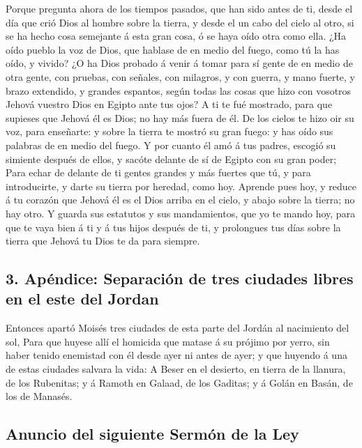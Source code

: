  Porque pregunta ahora de los tiempos pasados, que han sido
antes de ti, desde el día que crió Dios al hombre sobre la tierra, y
desde el un cabo del cielo al otro, si se ha hecho cosa semejante á esta
gran cosa, ó se haya oído otra como ella.  ¿Ha oído pueblo
la voz de Dios, que hablase de en medio del fuego, como tú la has oído,
y vivido?  ¿O ha Dios probado á venir á tomar para sí gente
de en medio de otra gente, con pruebas, con señales, con milagros, y con
guerra, y mano fuerte, y brazo extendido, y grandes espantos, según
todas las cosas que hizo con vosotros Jehová vuestro Dios en Egipto ante
tus ojos?  A ti te fué mostrado, para que supieses que
Jehová él es Dios; no hay más fuera de él.  De los cielos
te hizo oir su voz, para enseñarte: y sobre la tierra te mostró su gran
fuego: y has oído sus palabras de en medio del fuego.  Y
por cuanto él amó á tus padres, escogió su simiente después de ellos, y
sacóte delante de sí de Egipto con su gran poder;  Para
echar de delante de ti gentes grandes y más fuertes que tú, y para
introducirte, y darte su tierra por heredad, como hoy. 
Aprende pues hoy, y reduce á tu corazón que Jehová él es el Dios arriba
en el cielo, y abajo sobre la tierra; no hay otro.  Y
guarda sus estatutos y sus mandamientos, que yo te mando hoy, para que
te vaya bien á ti y á tus hijos después de ti, y prolongues tus días
sobre la tierra que Jehová tu Dios te da para siempre.

\hypertarget{apuxe9ndice-separaciuxf3n-de-tres-ciudades-libres-en-el-este-del-jordan}{%
\subsection{3. Apéndice: Separación de tres ciudades libres en el este
del
Jordan}\label{apuxe9ndice-separaciuxf3n-de-tres-ciudades-libres-en-el-este-del-jordan}}

 Entonces apartó Moisés tres ciudades de esta parte del
Jordán al nacimiento del sol,  Para que huyese allí el
homicida que matase á su prójimo por yerro, sin haber tenido enemistad
con él desde ayer ni antes de ayer; y que huyendo á una de estas
ciudades salvara la vida:  A Beser en el desierto, en
tierra de la llanura, de los Rubenitas; y á Ramoth en Galaad, de los
Gaditas; y á Golán en Basán, de los de Manasés.

\hypertarget{anuncio-del-siguiente-sermuxf3n-de-la-ley}{%
\subsection{Anuncio del siguiente Sermón de la
Ley}\label{anuncio-del-siguiente-sermuxf3n-de-la-ley}}

